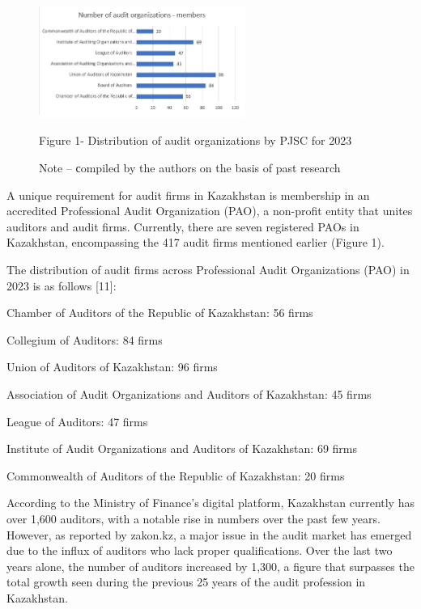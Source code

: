 \begin{figure}[H]
	\centering
	\includegraphics[width=0.6\textwidth]{media/ekon/image7.2}
	\caption*{Figure 1- Distribution of audit organizations by PJSC for 2023}
	\caption*{Note -- сompiled by the authors on the basis of past research}

\end{figure}

\begin{multicols}{2}

  A unique requirement for audit firms in Kazakhstan is membership in an
  accredited Professional Audit Organization (PAO), a non-profit entity
  that unites auditors and audit firms. Currently, there are seven
  registered PAOs in Kazakhstan, encompassing the 417 audit firms
  mentioned earlier (Figure 1).


The distribution of audit firms across Professional Audit Organizations
(PAO) in 2023 is as follows {[}11{]}:

Chamber of Auditors of the Republic of Kazakhstan: 56 firms

Collegium of Auditors: 84 firms

Union of Auditors of Kazakhstan: 96 firms

Association of Audit Organizations and Auditors of Kazakhstan: 45 firms

League of Auditors: 47 firms

Institute of Audit Organizations and Auditors of Kazakhstan: 69 firms

Commonwealth of Auditors of the Republic of Kazakhstan: 20 firms

According to the Ministry of Finance's digital platform, Kazakhstan
currently has over 1,600 auditors, with a notable rise in numbers over
the past few years. However, as reported by zakon.kz, a major issue in
the audit market has emerged due to the influx of auditors who lack
proper qualifications. Over the last two years alone, the number of
auditors increased by 1,300, a figure that surpasses the total growth
seen during the previous 25 years of the audit profession in Kazakhstan.


\end{multicols}
